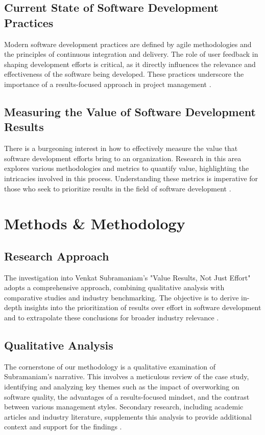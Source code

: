 \documentclass{article}
\begin{document}
\subsection{Current State of Software Development Practices}
Modern software development practices are defined by agile methodologies and the principles of continuous integration and delivery. The role of user feedback in shaping development efforts is critical, as it directly influences the relevance and effectiveness of the software being developed. These practices underscore the importance of a results-focused approach in project management \cite{Tawosi2022StoryPointsEffort, DelaneySchmidt2019ProductivityFramework}.

\subsection{Measuring the Value of Software Development Results}
There is a burgeoning interest in how to effectively measure the value that software development efforts bring to an organization. Research in this area explores various methodologies and metrics to quantify value, highlighting the intricacies involved in this process. Understanding these metrics is imperative for those who seek to prioritize results in the field of software development \cite{Lowe2019SoftwareMetrics, WagnerDeissenboeck2019}.




\newpage
\section{Methods \& Methodology}

\subsection{Research Approach}
The investigation into Venkat Subramaniam's "Value Results, Not Just Effort" adopts a comprehensive approach, combining qualitative analysis with comparative studies and industry benchmarking. The objective is to derive in-depth insights into the prioritization of results over effort in software development and to extrapolate these conclusions for broader industry relevance \cite{Chowdhury2015}.

\subsection{Qualitative Analysis}
The cornerstone of our methodology is a qualitative examination of Subramaniam's narrative. This involves a meticulous review of the case study, identifying and analyzing key themes such as the impact of overworking on software quality, the advantages of a results-focused mindset, and the contrast between various management styles. Secondary research, including academic articles and industry literature, supplements this analysis to provide additional context and support for the findings \cite{Lin2015HumanFactors, WagnerDeissenboeck2019}.
\end{document}
